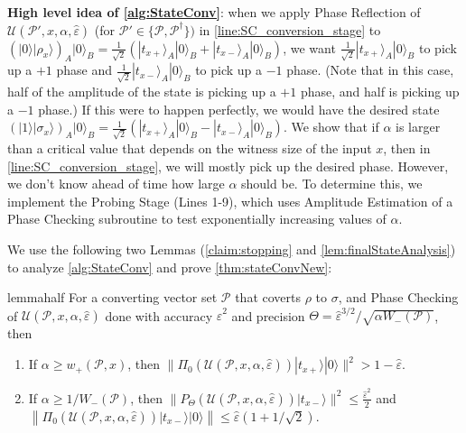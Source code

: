 \documentclass[cleveref, autoref, thm-restate,11pt]{article}
\theoremstyle{definition}
\newcommand{\sop}[1]{{\mathcal #1}}
\newcommand{\ket}[1]{|#1\rangle}
\renewcommand{\wp}[2]{{w_+({#1},{#2})}}
\newcommand{\Up}[4]{{\sop U({#1},{#2},{#3},{#4})}}
\begin{document}

\noindent \textbf{High level idea of \cref{alg:StateConv}}: when we apply Phase Reflection of $\Up{\mathscr
 P'}{x}{\alpha}{\hat{\varepsilon}}$ (for $\mathscr P'\in\{\mathscr P, \mathscr P^\dagger\})$ in \cref{line:SC_conversion_stage} to
 $(\ket{0}\ket{\rho_x})_A\ket{0}_B=\frac{1}{\sqrt{2}}(\ket{t_{x+}}_A\ket{0}_B+\ket{t_{x-}}_A\ket{0}_B)$,
 we want $\frac{1}{\sqrt{2}}\ket{t_{x+}}_A\ket{0}_B$ to pick up a $+1$ phase and 
 $\frac{1}{\sqrt{2}}\ket{t_{x-}}_A\ket{0}_B$ to pick up a $-1$ phase. (Note that in this case, half of 
 the amplitude of the state is picking up a $+1$ phase, and half is picking up a $-1$ phase.) If this were to happen perfectly,
 we would have the desired state $(\ket{1}\ket{\sigma_x})_A\ket{0}_B=\frac{1}{\sqrt{2}}(\ket{t_{x+}}_A\ket{0}_B
 -\ket{t_{x-}}_A\ket{0}_B)$. We show that if $\alpha$ is larger than a critical value that depends on the witness size of the input $x$, then in \cref{line:SC_conversion_stage}, we will mostly pick up the desired phase.
However, we don't know ahead of time how large $\alpha$ should be. To
determine this, we implement the Probing Stage (Lines 1-9), which uses Amplitude
Estimation of a Phase Checking subroutine to test exponentially increasing values of $\alpha$. 

We use the following two Lemmas (\cref{claim:stopping} and 
\cref{lem:finalStateAnalysis}) to analyze 
\cref{alg:StateConv} and prove \cref{thm:stateConvNew}:

\begin{restatable}{lemma}{half}\label{claim:stopping}
For a converting vector set $\mathscr P$ that coverts $\rho$ to $\sigma$, and Phase Checking of $\Up{\mathscr
 P}{x}{\alpha}{\hat{\varepsilon}}$ done with accuracy $\hat{\varepsilon}^2$ and 
precision $\Theta = \hat{\varepsilon}^{3/2}/\sqrt{\alpha W_-(\mathscr P)}$, then 
\begin{enumerate}
\item If $\alpha\geq \wp{\mathscr P}{x}$, then  $\|\Pi_0(\Up{\mathscr
 P}{x}{\alpha}{\hat{\varepsilon}})\ket{t_{x+}}\ket{0}\|^2> 1-\hat{\varepsilon}.$ \label{claim:stopping_1}
\item If $\alpha\geq 1/W_-(\mathscr P)$, then $\| P_\Theta(\Up{\mathscr
 P}{x}{\alpha}{\hat{\varepsilon}})\ket{t_{x-}} \|^2 \leq \frac{\hat{\varepsilon}^2}{2}$ and $\left\|\Pi_0(\Up{\mathscr
 P}{x}{\alpha}{\hat{\varepsilon}})\ket{t_{x-}}\ket{0}\right\|\leq \hat{\varepsilon}(1+1/\sqrt{2})$.\label{claim:stopping_2}
\end{enumerate}
\end{restatable}
\end{document}
